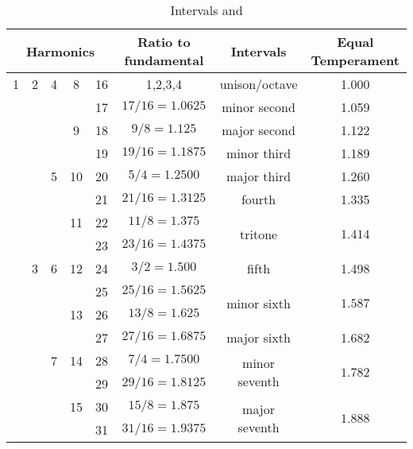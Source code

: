 
\begin{table*}[!h]
	\caption{Intervals and }
	\centering
	\begin{tabular}{|c|c|c|c|c|c|c|c|}
		\hline 
		\multicolumn{5}{|c|}{\textbf{Harmonics}}  &  \textbf{Ratio to fundamental} & \textbf{Intervals}  & \textbf{Equal Temperament}  \\
		\hline
		1 & 2 & 4 & 8 & 16  & 1,2,3,4 & unison/octave      & 1.000 \\
		\hline
		  &   &   &   & 17  & $17/16=1.0625$ & minor second & 1.059 \\
		  \hline
		  &   &   & 9 & 18   & $9/8=1.125$ & major second  & 1.122 \\
		  \hline
		  &   &   &   & 19    & $19/16=1.1875$ & minor third  & 1.189 \\
		  \hline
		  &   & 5 &10 & 20    & $5/4=1.2500$ & major third & 1.260 \\
		  \hline
		  &   &   &   & 21   & $21/16=1.3125$ & fourth & 1.335 \\
		  \hline
		  &   &   & 11& 22  & $11/8=1.375$ & \multirow{2}{*}{tritone}  & \multirow{2}{*}{$1.414$} \\
		  &   &   &   & 23  & $23/16=1.4375$ &   &  \\
		  \hline
		  & 3 & 6 &12 & 24 & $3/2=1.500$ &  fifth  & 1.498 \\
		  \hline
		  &   &   &  & 25 & $25/16=1.5625$ & \multirow{2}{*}{minor sixth} &\multirow{2}{*}{$1.587$}\\
		  &   &   &13 & 26 & $13/8 = 1.625$              &             &  \\
		  \hline
		  &   &   &   & 27    & $27/16=1.6875$ & major sixth & 1.682 \\
		  \hline
		  &   & 7 & 14& 28 & $7/4=1.7500$ & \multirow{2}{*}{minor seventh} & \multirow{2}{*}{$1.782$}  \\
		  &   &   &   & 29 & $29/16 = 1.8125$         &             &  \\
		  \hline
		  &   &   & 15& 30 & $15/8=1.875$ & \multirow{2}{*}{major seventh} & \multirow{2}{*}{$1.888$} \\
		  &   &   &   & 31 & $31/16=1.9375$        &  &  \\
		\hline
	\end{tabular}
	\label{tab: }
\end{table*}
